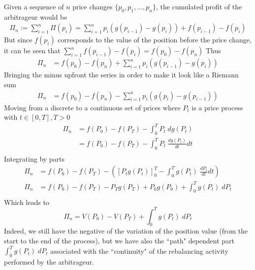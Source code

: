 \documentclass[12pt]{article}
\begin{document}
Given a sequence of $n$ price changes $\{p_0, p_1, \dots, p_n\}$, the cumulated profit of the arbitrageur would be
\begin{align*}
    \Pi_n := \sum_{i=1}^{n}\Pi(p_i) = \sum_{i=1}^{n}p_i(g(p_{i-1})-g(p_i))+f(p_{i-1})-f(p_i)
\end{align*}
But since $f(p_i)$ corresponds to the value of the position before the price change, it can be seen that $\sum_{i=1}^{n}f(p_{i-1})-f(p_i)=f(p_0) -f(p_n)$
\newline
Thus
\begin{align*}
    \Pi_n & = f(p_0) -f(p_n)+\sum_{i=1}^{n}p_i(g(p_{i-1})-g(p_i))
\end{align*}
Bringing the minus upfront the series in order to make it look like a Riemann sum
\begin{align*}
    \Pi_n & = f(p_0) -f(p_n)-\sum_{i=1}^{n}p_i(g(p_i)-g(p_{i-1}))
\end{align*}
Moving from a discrete to a continuous set of prices where $P_t$ is a price process with $t\in[0,T], T>0$
\begin{align*}
    \Pi_n & = f(P_0) -f(P_T)-\int_{0}^{T}P_t  \; dg(P_t)              \\
          & = f(P_0) -f(P_T)-\int_{0}^{T}P_t  \; \frac{dg(P_t)}{dt}dt \\
\end{align*}
Integrating by parts
\begin{align*}
    \Pi_n & = f(P_0) -f(P_T) -\left( \left[
        P_t g(P_t)
    \right]^T_0 -     \int_{0}^{T}g(P_t)  \; \frac{dP_t}{dt}dt                          \right) \\
    \Pi_n & = f(P_0) -f(P_T) - P_T g(P_T)+ P_0 g(P_0) +     \int_{0}^{T}g(P_t)  \; dP_t         \\
\end{align*}
Which leads to
\begin{equation}
    \Pi_n = V(P_0) -V(P_T) +     \int_{0}^{T}g(P_t)  \; dP_t \label{eq:11}
\end{equation}
Indeed, we still have the negative of the variation of the position value (from the start to the end of the process), but we have also the ``path" dependent part $\int_{0}^{T}g(P_t)  \; dP_t$ associated with the ``continuity" of the rebalancing activity performed by the arbitrageur.
\newpage
\end{document}

